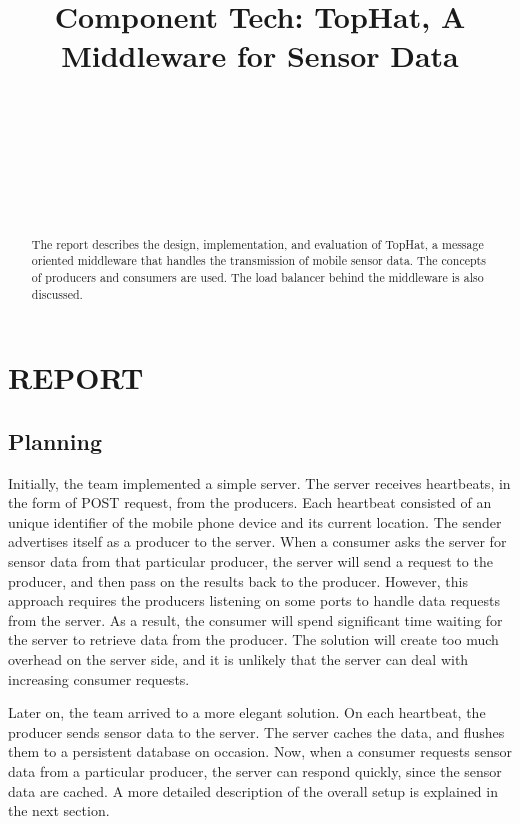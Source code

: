 \documentclass{sigchi}
\begin{document}
\title{Component Tech: TopHat, A Middleware for Sensor Data}

\author{
  \\
    \\
    \\
  \\
    \\
    \\
}

\maketitle

\begin{abstract}
The report describes the design, implementation, and evaluation of TopHat, a message oriented middleware that handles the transmission of mobile sensor data. The concepts of producers and consumers are used. The load balancer behind the middleware is also discussed.
\end{abstract}

\section{REPORT}

\subsection{Planning}

Initially, the team implemented a simple server. The server receives heartbeats, in the form of POST request, from the producers. Each heartbeat consisted of an unique identifier of the mobile phone device and its current location. The sender advertises itself as a producer to the server. When a consumer asks the server for sensor data from that particular producer, the server will send a request to the producer, and then pass on the results back to the producer. However, this approach requires the producers listening on some ports to handle data requests from the server. As a result, the consumer will spend significant time waiting for the server to retrieve data from the producer. The solution will create too much overhead on the server side, and it is unlikely that the server can deal with increasing consumer requests.

Later on, the team arrived to a more elegant solution. On each heartbeat, the producer sends sensor data to the server. The server caches the data, and flushes them to a persistent database on occasion. Now, when a consumer requests sensor data from a particular producer, the server can respond quickly, since the sensor data are cached. A more detailed description of the overall setup is explained in the next section.
\end{document}
